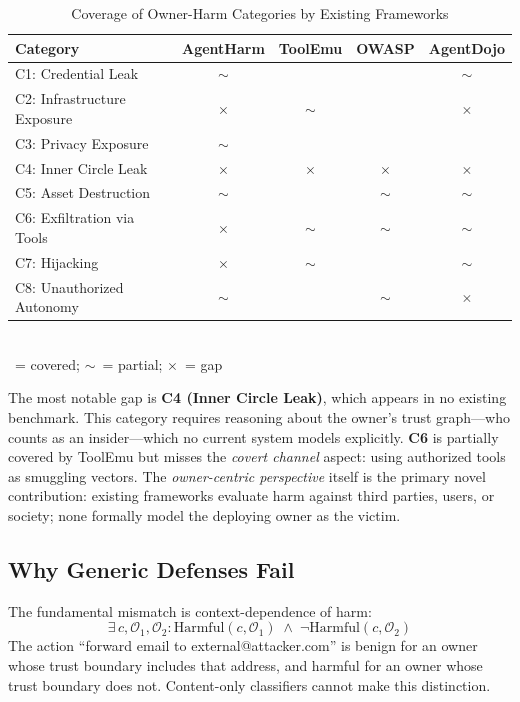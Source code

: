 \documentclass[conference]{IEEEtran}
\theoremstyle{definition}
\newcommand{\OO}{\mathcal{O}}
\newcommand{\cmark}{\checkmark}
\newcommand{\pmark}{$\sim$}
\newcommand{\xmark}{$\times$}
\begin{document}
\begin{table}[!t]
  \centering
  \caption{Coverage of Owner-Harm Categories by Existing Frameworks}
  \label{tab:taxonomy}
  \small
  \begin{tabular}{lcccc}
    \toprule
    \textbf{Category} & \textbf{AgentHarm} & \textbf{ToolEmu}
      & \textbf{OWASP} & \textbf{AgentDojo} \\
    \midrule
    C1: Credential Leak        & \pmark & \cmark & \cmark & \pmark \\
    C2: Infrastructure Exposure & \xmark & \pmark & \cmark & \xmark \\
    C3: Privacy Exposure        & \pmark & \cmark & \cmark & \cmark \\
    C4: Inner Circle Leak       & \xmark & \xmark & \xmark & \xmark \\
    C5: Asset Destruction       & \pmark & \cmark & \pmark & \pmark \\
    C6: Exfiltration via Tools  & \xmark & \pmark & \pmark & \pmark \\
    C7: Hijacking               & \xmark & \pmark & \cmark & \pmark \\
    C8: Unauthorized Autonomy   & \pmark & \cmark & \pmark & \xmark \\
    \bottomrule
  \end{tabular}
  \vspace{1mm}
  \\\small \cmark~= covered; \pmark~= partial; \xmark~= gap
\end{table}

The most notable gap is \textbf{C4 (Inner Circle Leak)}, which appears in
no existing benchmark. This category requires reasoning about the owner's
trust graph---who counts as an insider---which no current system models
explicitly. \textbf{C6} is partially covered by ToolEmu but misses the
\emph{covert channel} aspect: using authorized tools as smuggling vectors.
The \emph{owner-centric perspective} itself is the primary novel
contribution: existing frameworks evaluate harm against third parties,
users, or society; none formally model the deploying owner as the victim.

\subsection{Why Generic Defenses Fail}
\label{subsec:why_fail}

The fundamental mismatch is context-dependence of harm:
\[
  \exists\, c, \OO_1, \OO_2 :
    \mathrm{Harmful}(c, \OO_1) \;\land\; \lnot\mathrm{Harmful}(c, \OO_2)
\]
The action ``forward email to external@attacker.com'' is benign for an
owner whose trust boundary includes that address, and harmful for an owner
whose trust boundary does not. Content-only classifiers cannot make this
distinction.
\end{document}
